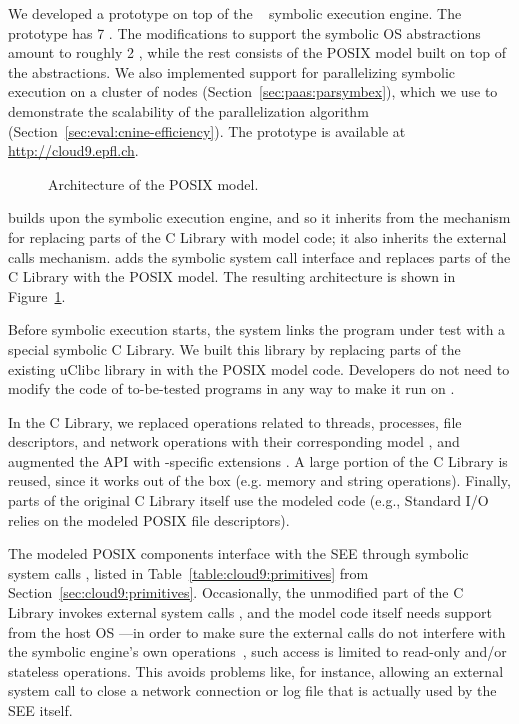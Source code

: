 We developed a \cnine prototype on top of the \klee~\cite{klee} symbolic execution engine.  The prototype has 7 \kloc.
%
The \klee modifications to support the symbolic OS abstractions amount to roughly 2 \kloc, while the rest consists of the POSIX model built on top of the abstractions.
%
We also implemented support for parallelizing symbolic execution on a cluster of nodes (Section~\ref{sec:paas:parsymbex}), which we use to demonstrate the scalability of the parallelization algorithm (Section~\ref{sec:eval:cnine-efficiency}).
%
The \cnine prototype is available at {\url{http://cloud9.epfl.ch}}.

\begin{figure}
  \centering
  \caption{Architecture of the \cnine POSIX model.}
  \label{fig:cloud9:posixmodel}
\end{figure}

\cnine builds upon the \klee symbolic execution engine, and so it inherits from \klee the mechanism for replacing parts of the C Library with model code; it also inherits the external calls mechanism.  \cnine adds the symbolic system call interface and replaces parts of the C Library with the POSIX model.  The resulting architecture is shown in Figure~\ref{fig:cloud9:posixmodel}.

Before symbolic execution starts, the \cnine system links the program under test with a special symbolic C Library.
%
We built this library by replacing parts of the existing uClibc library in \klee with the POSIX model code.  Developers do not need to modify the code of to-be-tested programs in any way to make it run on \cnine.  

In the C Library, we replaced operations related to threads, processes, file descriptors, and network operations with their corresponding model \cI, and augmented the API with \cnine-specific extensions \cII.
%
A large portion of the C Library is reused, since it works out of the box \cIII (e.g. memory and string operations).  Finally, parts of the original C Library itself use  the modeled code \cIV (e.g., Standard I/O  relies on the modeled POSIX file descriptors).

The modeled POSIX components interface with the SEE through symbolic system calls \cV, listed in Table~\ref{table:cloud9:primitives} from Section~\ref{sec:cloud9:primitives}.
%
Occasionally, the unmodified part of the C Library invokes external system calls \cVI, and the model code itself needs support from the host OS \cVII---in order to make sure the external calls do not interfere with the symbolic engine's own operations~\cVIII, such access is limited to read-only and/or stateless operations.  This avoids problems like, for instance, allowing an external  system call to close a network connection or log file that is actually used by the SEE itself.

